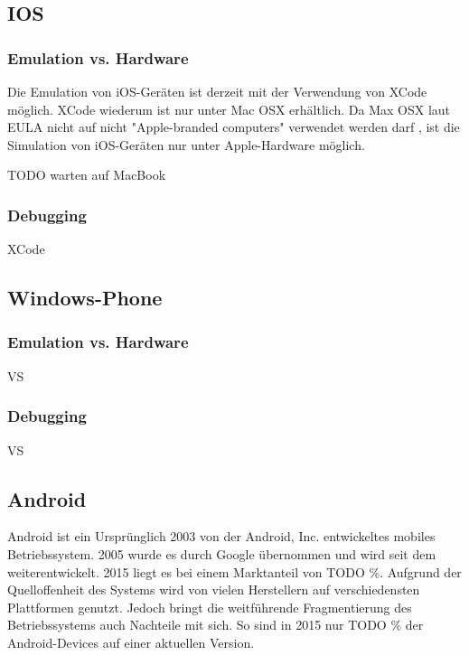 		\subsection{IOS}
			\subsubsection{Emulation vs. Hardware}
			Die Emulation von iOS-Geräten ist derzeit mit der Verwendung von XCode möglich. XCode wiederum ist nur unter Mac OSX erhältlich. Da Max OSX laut EULA nicht auf nicht "Apple-branded computers" verwendet werden darf \cite{AppleEULA}, ist die Simulation von iOS-Geräten nur unter Apple-Hardware möglich.
			
TODO warten auf MacBook
			\subsubsection{Debugging}
			XCode
		\subsection{Windows-Phone}
			\subsubsection{Emulation vs. Hardware}
			VS
			\subsubsection{Debugging}
			VS	
		\subsection{Android}
			Android ist ein Ursprünglich 2003 von der Android, Inc. entwickeltes mobiles Betriebssystem. 2005 wurde es durch Google übernommen und wird seit dem weiterentwickelt. 2015 liegt es bei einem Marktanteil von TODO \%. Aufgrund der Quelloffenheit des Systems wird von vielen Herstellern auf verschiedensten Plattformen genutzt. Jedoch bringt die weitführende Fragmentierung des Betriebssystems auch Nachteile mit sich. So sind in 2015 nur TODO \% der Android-Devices auf einer aktuellen Version.\cite{Drake2014}
